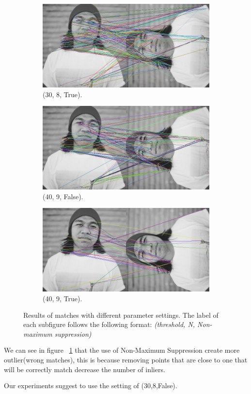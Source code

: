 \begin{figure}[h!]
\begin{subfigure}{0.5\textwidth}
  \centering
  \includegraphics[width=0.9\linewidth]{figs/match-30-8-true.jpg}
  \caption{(30, 8, True).}
\end{subfigure}
\begin{subfigure}{0.5\textwidth}
  \centering
  \includegraphics[width=0.9\linewidth]{figs/match-40-9-false.jpg}
  \caption{(40, 9, False).}
\end{subfigure}%
\begin{subfigure}{0.5\textwidth}
  \centering
  \includegraphics[width=0.9\linewidth]{figs/match-40-9-true.jpg}
  \caption{(40, 9, True).}
\end{subfigure}
 \caption{Results of matches with different parameter settings. The label of each subfigure follows the following format: \textit{(threshold, N, Non-maximum suppression)}}
\label{fig:keypoints-match}
\end{figure}

We can see in figure ~\ref{fig:keypoints-match} that the use of Non-Maximum Suppression create more outlier(wrong matches), this is because removing points that are close to one that will be correctly match decrease the number of inliers.


Our experiments suggest to use the setting of (30,8,False).  
